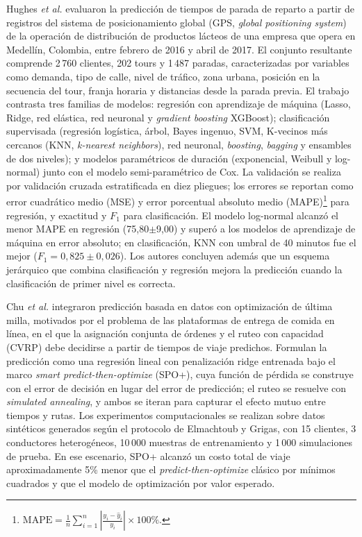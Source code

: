\documentclass[journal]{IEEEtran}
\begin{document}
Hughes \emph{et al.} \cite{hughes2019} evaluaron la predicción de tiempos de parada de reparto a partir de registros del sistema de posicionamiento global (GPS, \textit{global positioning system}) de la operación de distribución de productos lácteos de una empresa que opera en Medellín, Colombia, entre febrero de 2016 y abril de 2017. El conjunto resultante comprende 2\,760 clientes, 202 tours y 1\,487 paradas, caracterizadas por variables como demanda, tipo de calle, nivel de tráfico, zona urbana, posición en la secuencia del tour, franja horaria y distancias desde la parada previa. El trabajo contrasta tres familias de modelos: regresión con aprendizaje de máquina (Lasso, Ridge, red elástica, red neuronal y \textit{gradient boosting} XGBoost); clasificación supervisada (regresión logística, árbol, Bayes ingenuo, SVM, K-vecinos más cercanos (KNN, \textit{k-nearest neighbors}), red neuronal, \textit{boosting}, \textit{bagging} y ensambles de dos niveles); y modelos paramétricos de duración (exponencial, Weibull y log-normal) junto con el modelo semi-paramétrico de Cox. La validación se realiza por validación cruzada estratificada en diez pliegues; los errores se reportan como error cuadrático medio (MSE) y error porcentual absoluto medio (MAPE)\footnote{$\mathrm{MAPE}=\frac{1}{n}\sum_{i=1}^{n}\left|\frac{y_i-\hat{y}_i}{y_i}\right|\times 100\%$.} para regresión, y exactitud y $F_1$ para clasificación. El modelo log-normal alcanzó el menor MAPE en regresión (75,80$\pm$9,00) y superó a los modelos de aprendizaje de máquina en error absoluto; en clasificación, KNN con umbral de 40 minutos fue el mejor ($F_1=0{,}825\pm0{,}026$). Los autores concluyen además que un esquema jerárquico que combina clasificación y regresión mejora la predicción cuando la clasificación de primer nivel es correcta.

Chu \emph{et al.} \cite{chu2023} integraron predicción basada en datos con optimización de última milla, motivados por el problema de las plataformas de entrega de comida en línea, en el que la asignación conjunta de órdenes y el ruteo con capacidad (CVRP) debe decidirse a partir de tiempos de viaje predichos. Formulan la predicción como una regresión lineal con penalización ridge entrenada bajo el marco \textit{smart predict-then-optimize} (SPO+), cuya función de pérdida se construye con el error de decisión en lugar del error de predicción; el ruteo se resuelve con \textit{simulated annealing}, y ambos se iteran para capturar el efecto mutuo entre tiempos y rutas. Los experimentos computacionales se realizan sobre datos sintéticos generados según el protocolo de Elmachtoub y Grigas, con 15 clientes, 3 conductores heterogéneos, 10\,000 muestras de entrenamiento y 1\,000 simulaciones de prueba. En ese escenario, SPO+ alcanzó un costo total de viaje aproximadamente 5\% menor que el \textit{predict-then-optimize} clásico por mínimos cuadrados y que el modelo de optimización por valor esperado.
\end{document}
